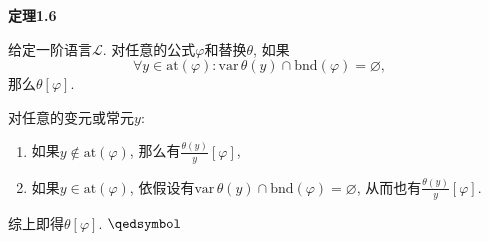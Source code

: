 

\vspace{10pt}

\hypertarget{sec:定理1.6}{}
\noindent\textbf{定理1.6}

给定一阶语言$\mathcal{L}$. 对任意的公式$\varphi$和替换$\theta$, 如果
\[
    \forall y\in\mathrm{at}(\varphi):
    \mathrm{var}\,\theta(y)\cap\mathrm{bnd}(\varphi)=\varnothing,
\]
那么$\theta[\varphi]$.


对任意的变元或常元$y$:
\vspace{3pt}
\begin{enumerate}
    \item 如果$y\notin\mathrm{at}(\varphi)$,
    那么有$\displaystyle\frac{\theta(y)}{y}[\varphi]$,
    \item 如果$y\in\mathrm{at}(\varphi)$,
    依假设有$\mathrm{var}\,\theta(y)\cap\mathrm{bnd}(\varphi)=\varnothing$,
    从而也有$\displaystyle\frac{\theta(y)}{y}[\varphi]$.
\end{enumerate}

综上即得$\theta[\varphi]$. \hfill $\qedsymbol$

